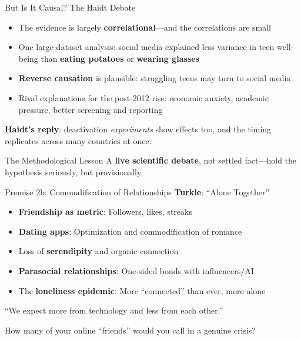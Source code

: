 ﻿\documentclass[aspectratio=169,11pt]{beamer}
\begin{document}
\begin{frame}{But Is It Causal? The Haidt Debate}
\begin{objectionbox}
\small
\begin{itemize}
    \item The evidence is largely \textbf{correlational}---and the correlations are small
    \item One large-dataset analysis: social media explained less variance in teen well-being than \textbf{eating potatoes} or \textbf{wearing glasses}
    \item \textbf{Reverse causation} is plausible: struggling teens may turn to social media
    \item Rival explanations for the post-2012 rise: economic anxiety, academic pressure, better screening and reporting
\end{itemize}
\end{objectionbox}

\vspace{0.15cm}
{\small \textbf{Haidt's reply}: deactivation \emph{experiments} show effects too, and the timing replicates across many countries at once.}

\vspace{0.1cm}
\begin{alertblock}{The Methodological Lesson}
\small A \textbf{live scientific debate}, not settled fact---hold the hypothesis seriously, but provisionally.
\end{alertblock}
\end{frame}

\begin{frame}{Premise 2b: Commodification of Relationships}
\textbf{Turkle}: ``Alone Together''

\begin{itemize}
    \item \textbf{Friendship as metric}: Followers, likes, streaks
    \item \textbf{Dating apps}: Optimization and commodification of romance
    \item Loss of \textbf{serendipity} and organic connection
    \item \textbf{Parasocial relationships}: One-sided bonds with influencers/AI
    \item The \textbf{loneliness epidemic}: More ``connected'' than ever, more alone
\end{itemize}

\vspace{0.3cm}
\begin{quotebox}
``We expect more from technology and less from each other.''
\end{quotebox}

\begin{discussionbox}[Discussion]
How many of your online ``friends'' would you call in a genuine crisis?
\end{discussionbox}
\end{frame}
\end{document}
